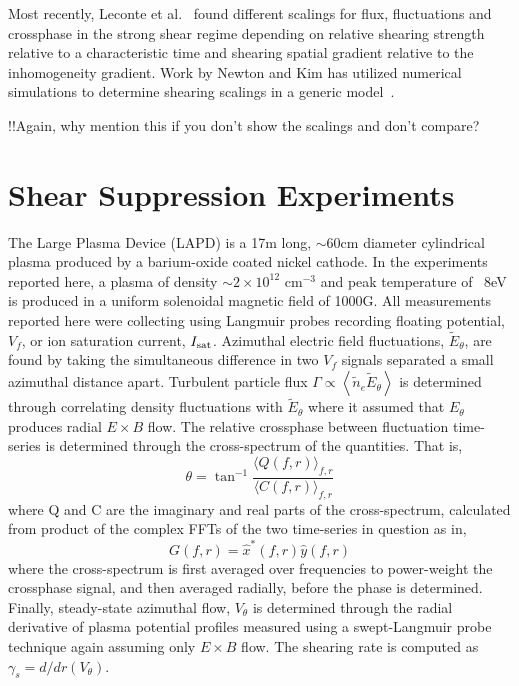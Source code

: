 \documentclass[aip,pop,amsmath,amssymb,reprint,superscriptaddress]{revtex4-1} %
\begin{document}
Most recently, Leconte et al.~\cite{leconte06} found different scalings for flux, fluctuations and crossphase in the strong shear regime depending on relative shearing strength relative to a characteristic time and shearing spatial gradient relative to the inhomogeneity gradient. Work by Newton and Kim has utilized numerical simulations to determine shearing scalings in a generic model~\cite{newton07,newton11}.

!!Again, why mention this if you don't show the scalings and don't compare?

\section{Shear Suppression Experiments}

The Large Plasma Device \cite{gek91} (LAPD) is a 17m long, $\sim$60cm diameter cylindrical plasma produced by a barium-oxide coated nickel cathode. In the experiments reported here, a plasma of density $\sim$$2 \times 10^{12}$ cm$^{-3}$ and peak temperature of ~8eV is produced in a uniform solenoidal magnetic field of 1000G. All measurements reported here were collecting using Langmuir probes recording floating potential, $V_{f}$, or ion saturation current, $I_{\rm sat}$. Azimuthal electric field fluctuations, $\tilde{E}_{\theta}$, are found by taking the simultaneous difference in two $V_{f}$ signals separated a small azimuthal distance apart. Turbulent particle flux $\Gamma \propto \left<\tilde{n}_e \tilde{E}_\theta\right>$ is determined through correlating density fluctuations with $\tilde{E}_{\theta}$ where it assumed that $E_{\theta}$ produces radial $E \times B$ flow. The relative crossphase between fluctuation time-series is determined through the cross-spectrum of the quantities. That is,
%
\begin{equation}
\theta = \tan^{-1}\frac{\langle Q(f,r)\rangle_{f,r}}{\langle C(f,r)\rangle_{f,r}}
\label{eq:crossphase}
\end{equation}
%
where Q and C are the imaginary and real parts of the cross-spectrum, calculated from product of the complex FFTs of the two time-series in question as in,
\begin{equation}
G(f,r) = \hat{x}^{\ast}(f,r)\hat{y}(f,r)
\label{eq:crossspectrum}
\end{equation}
%
where the cross-spectrum is first averaged over frequencies to power-weight the crossphase signal, and then averaged radially, before the phase is determined. Finally, steady-state azimuthal flow, $V_{\theta}$ is determined through the radial derivative of plasma potential profiles measured using a swept-Langmuir probe technique again assuming only $E \times B$ flow. The shearing rate is computed as $\gamma_{s} = d/dr(V_{\theta})$.
\end{document}
